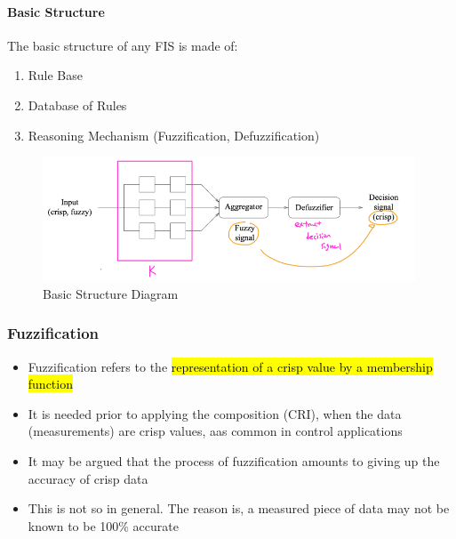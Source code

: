 \documentclass{tron}
\begin{document}
\paragraph{Basic Structure}
The basic structure of any FIS is made of:
\begin{enumerate}
	\item Rule Base
	\item Database of Rules
	\item Reasoning Mechanism (Fuzzification, Defuzzification)
\end{enumerate}
\begin{figure}[H]
	\centering
	\includegraphics[height=140px]{Figs/FuzzyInferencing/fuzzy-struct}
	\caption{Basic Structure Diagram}
	\label{fig:fuzzy-inf:struct}
\end{figure}

\subsubsection{Fuzzification}
\begin{itemize}
	\item Fuzzification refers to the \hl{representation of a crisp value by a membership function}
	\item It is needed prior to applying the composition (CRI), when the data (measurements) are crisp values, aas common in control applications
	\item It may be argued that the process of fuzzification amounts to giving up the accuracy of crisp data
	\item This is not so in general. The reason is, a measured piece of data may not be known to be 100\% accurate
\end{itemize}

\end{document}
